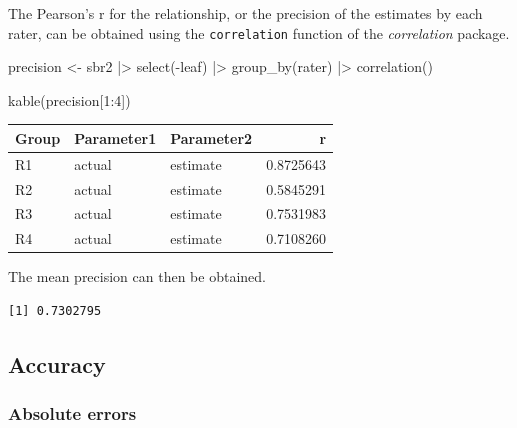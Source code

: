 \documentclass[
  letterpaper,
  DIV=11,
  numbers=noendperiod]{scrreprt}
\newenvironment{Shaded}{\begin{snugshade}}{\end{snugshade}}
\newcommand{\DecValTok}[1]{\textcolor[rgb]{0.68,0.00,0.00}{#1}}
\newcommand{\FunctionTok}[1]{\textcolor[rgb]{0.28,0.35,0.67}{#1}}
\newcommand{\NormalTok}[1]{\textcolor[rgb]{0.00,0.23,0.31}{#1}}
\newcommand{\OtherTok}[1]{\textcolor[rgb]{0.00,0.23,0.31}{#1}}
\newcommand{\SpecialCharTok}[1]{\textcolor[rgb]{0.37,0.37,0.37}{#1}}
\begin{document}
The Pearson's r for the relationship, or the precision of the estimates
by each rater, can be obtained using the \texttt{correlation} function
of the \emph{correlation} package.

\begin{Shaded}
\begin{Highlighting}[]
\NormalTok{precision }\OtherTok{\textless{}{-}}\NormalTok{ sbr2 }\SpecialCharTok{|\textgreater{}} 
  \FunctionTok{select}\NormalTok{(}\SpecialCharTok{{-}}\NormalTok{leaf) }\SpecialCharTok{|\textgreater{}} 
  \FunctionTok{group\_by}\NormalTok{(rater) }\SpecialCharTok{|\textgreater{}} 
  \FunctionTok{correlation}\NormalTok{() }

\FunctionTok{kable}\NormalTok{(precision[}\DecValTok{1}\SpecialCharTok{:}\DecValTok{4}\NormalTok{])}
\end{Highlighting}
\end{Shaded}

\begin{longtable}[]{@{}lllr@{}}
\toprule\noalign{}
Group & Parameter1 & Parameter2 & r \\
\midrule\noalign{}
\endhead
\bottomrule\noalign{}
\endlastfoot
R1 & actual & estimate & 0.8725643 \\
R2 & actual & estimate & 0.5845291 \\
R3 & actual & estimate & 0.7531983 \\
R4 & actual & estimate & 0.7108260 \\
\end{longtable}

The mean precision can then be obtained.

\begin{Shaded}
\end{Shaded}

\begin{verbatim}
[1] 0.7302795
\end{verbatim}

\hypertarget{accuracy}{%
\subsection{Accuracy}\label{accuracy}}

\hypertarget{absolute-errors}{%
\subsubsection{Absolute errors}\label{absolute-errors}}
\end{document}
